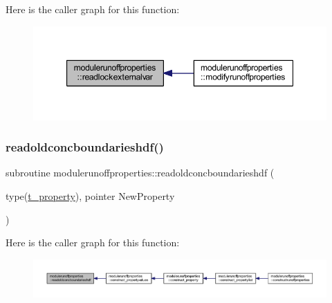 Here is the caller graph for this function\+:\nopagebreak
\begin{figure}[H]
\begin{center}
\leavevmode
\includegraphics[width=347pt]{namespacemodulerunoffproperties_a281dc2c8e1ac168295c6bbff10a4bf54_icgraph}
\end{center}
\end{figure}
\mbox{\label{namespacemodulerunoffproperties_a51f42b03c77afc107222186d842f228e}} 
\subsubsection{\texorpdfstring{readoldconcboundarieshdf()}{readoldconcboundarieshdf()}}
{\footnotesize\ttfamily subroutine modulerunoffproperties\+::readoldconcboundarieshdf (\begin{DoxyParamCaption}\item[{type(\mbox{\hyperlink{structmodulerunoffproperties_1_1t__property}{t\+\_\+property}}), pointer}]{New\+Property }\end{DoxyParamCaption})\hspace{0.3cm}{\ttfamily [private]}}

Here is the caller graph for this function\+:\nopagebreak
\begin{figure}[H]
\begin{center}
\leavevmode
\includegraphics[width=350pt]{namespacemodulerunoffproperties_a51f42b03c77afc107222186d842f228e_icgraph}
\end{center}
\end{figure}
\mbox{\label{namespacemodulerunoffproperties_abc9cf8901e71a0c3d3b26dd7b5414361}} 
